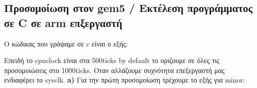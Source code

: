 \documentclass[10pt]{report}
\newcommand{\tu}{\textunderscore}
\begin{document}

\subsection{Προσομοίωση στον gem5 / Εκτέλεση προγράμματος σε C σε arm επξεργαστή}
O κώδικας που γράψαμε σε c είναι ο εξής:

\newline
Επειδή το cpu\tu clock είναι στα 500ticks by default το οριζουμε σε όλες τις προσομοιώσεις στο 1000ticks. Οταν αλλάζουμε συχνότητα επεξεργαστή μας ενδιαφέρει το sys\tu clk.\newline
\textbf{a)}\newline
Για την πρώτη προσομοίωση τρέχουμε το εξής για minor:\newline
\end{document}

